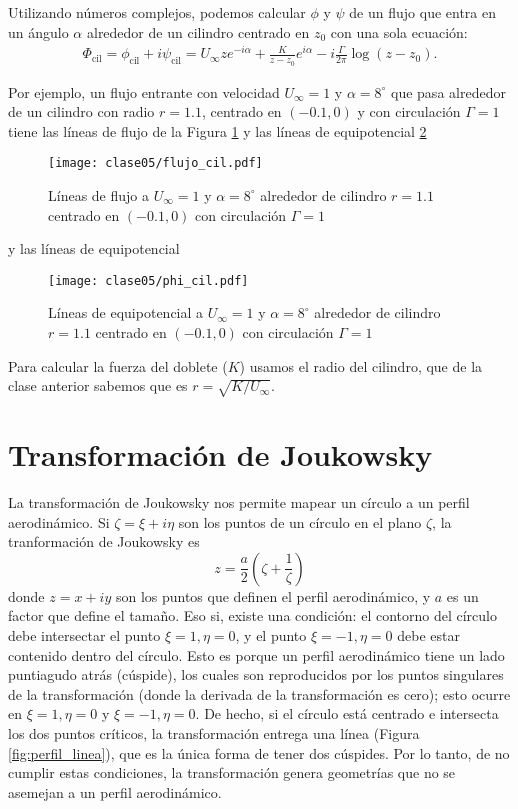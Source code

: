 Utilizando números complejos, podemos calcular $\phi$ y $\psi$ de un flujo que entra en un ángulo $\alpha$ alrededor de un cilindro centrado en $z_0$ con una sola ecuación:
%
\begin{align} \label{eq:cilindro}
\Phi_\text{cil} = \phi_\text{cil}+i\psi_\text{cil} = U_\infty z e^{-i\alpha} + \frac{K}{z-z_0}e^{i\alpha} -i\frac{\Gamma}{2\pi} \log(z-z_0).
\end{align}

Por ejemplo, un flujo entrante con velocidad $U_\infty=1$ y $\alpha=8^\circ$ que pasa alrededor de un cilindro con radio $r=1.1$, centrado en $(-0.1,0)$ y con circulación $\Gamma=1$ tiene las líneas de flujo de la Figura \ref{fig:flujo_cil} y las líneas de equipotencial \ref{fig:phi_cil}
%
\begin{figure}[h!]
\centering
\texttt{[image: clase05/flujo\_cil.pdf]}
\caption{Líneas de flujo a $U_\infty=1$ y $\alpha=8^\circ$ alrededor de cilindro $r=1.1$ centrado en $(-0.1,0)$ con circulación $\Gamma=1$}\label{fig:flujo_cil}
\end{figure}
%
y las líneas de equipotencial
%
\begin{figure}[h!]
\centering
\texttt{[image: clase05/phi\_cil.pdf]}
\caption{Líneas de equipotencial a $U_\infty=1$ y $\alpha=8^\circ$ alrededor de cilindro $r=1.1$ centrado en $(-0.1,0)$ con circulación $\Gamma=1$}\label{fig:phi_cil}
\end{figure}

Para calcular la fuerza del doblete ($K$) usamos el radio del cilindro, que de la clase anterior sabemos que es $r=\sqrt{K/U_\infty}$.

\section*{Transformación de Joukowsky}

La transformación de Joukowsky nos permite mapear un círculo a un perfil aerodinámico. 
Si $\zeta = \xi + i\eta$ son los puntos de un círculo en el plano $\zeta$, la tranformación de Joukowsky es
%
\begin{equation}
z = \frac{a}{2}\left(\zeta + \frac{1}{\zeta}\right)
\end{equation}
%
donde $z=x+iy$ son los puntos que definen el perfil aerodinámico, y $a$ es un factor que define el tamaño. 
Eso si, existe una condición: el contorno del círculo debe intersectar el punto $\xi=1, \eta=0$, y el punto $\xi=-1, \eta=0$ debe estar contenido dentro del círculo. 
Esto es porque un perfil aerodinámico tiene un lado puntiagudo atrás (cúspide), los cuales son reproducidos por los puntos singulares de la transformación (donde la derivada de la transformación es cero); esto ocurre en $\xi=1, \eta=0$ y $\xi=-1, \eta=0$.
De hecho, si el círculo está centrado e intersecta los dos puntos críticos, la transformación entrega una línea (Figura \ref{fig:perfil_linea}), que es la única forma de tener dos cúspides.
Por lo tanto, de no cumplir estas condiciones, la transformación genera geometrías que no se asemejan a un perfil aerodinámico.

